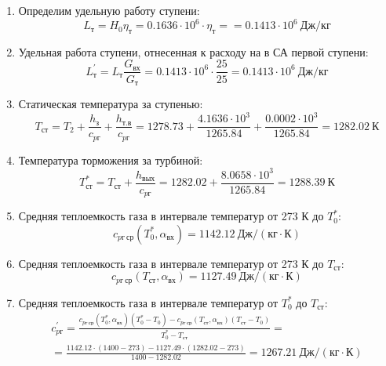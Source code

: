\documentclass[a4paper,10pt]{article}
\begin{document}
\begin{enumerate}
        
        \item Определим удельную работу ступени:
        \[
            L_т = H_0 \eta_т = 0.1636 \cdot 10^6 \cdot \eta_т =
            = 0.1413 \cdot 10^6 \ Дж/кг
        \]
        

        \item Удельная работа ступени, отнесенная к расходу на в СА первой ступени:
        \[
            L_т^\prime = L_т \frac{ G_{вх} }{ G_т }  =
                0.1413 \cdot 10^6 \cdot
                \frac{ 25 }{ 25 } =
            0.1413 \cdot 10^6 \ Дж/кг
        \]

        \item Статическая температура за ступенью:
        \[
            T_{ст} = T_2 + \frac{ h_з }{ c_{pг} } + \frac{ h_{т.в} }{ c_{pг} } =
                1278.73 +
                \frac{4.1636 \cdot 10^3 }{ 1265.84 } +
                \frac{ 0.0002 \cdot 10^3 }{ 1265.84 } =
            1282.02 \ К
        \]

        \item Температура торможения за турбиной:
        \[
            T_{ст}^* = T_{ст} + \frac{ h_{вых} }{ c_{pг} } =
                1282.02 +
                \frac{ 8.0658 \cdot 10^3 }{ 1265.84 } =
            1288.39 \ К
        \]

        \item Средняя теплоемкость газа в интервале температур от 273 К до $T_0^*$:
        \[
            c_{pг\ ср} (T_0^*, \alpha_{вх}) =
            1142.12 \ Дж/(кг \cdot К)
        \]

        \item Средняя теплоемкость газа в интервале температур от 273 К до $T_{ст}$:
        \[
            c_{pг\ ср} (T_{ст}, \alpha_{вх}) =
            1127.49 \ Дж/(кг \cdot К)
        \]

        \item Средняя теплоемкость газа в интервале температур от $T_0^*$ до $T_{ст}$:
        \begin{gather*}
            c_{pг}^\prime = \frac{
		        c_{pг\ ср} (T_0^*, \alpha_{вх}) (T_0^* - T_0) - c_{pг\ ср} (T_{ст}, \alpha_{вх})(T_{ст} - T_0)
		    }{
		        T_0^* - T_{ст}} =\\
            =\frac{
		        1142.12 \cdot
                (1400 - 273) -
		        1127.49 \cdot
                (1282.02 - 273)
		    }{
		        1400 - 1282.02} =
		    1267.21 \ Дж / (кг \cdot К)\\
        \end{gather*}


\end{enumerate}
\end{document}
